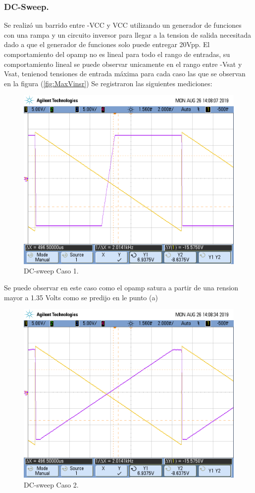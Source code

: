 \subsubsection{DC-Sweep.}
Se realizó un barrido entre -VCC y VCC utilizando un generador de funciones con una rampa y un circuito inversor para llegar a la tension de salida necesitada dado a que el generador de funciones solo puede entregar 20Vpp.
El comportamiento del opamp no es lineal para todo el rango de entradas, su comportamiento lineal se puede observar unicamente en el rango entre -Vsat y Vsat, tenienod tensiones de entrada máxima para cada caso las que se observan en la figura (\ref{fig:MaxVinsr})
Se registraron las siguientes mediciones:
\begin{figure}[H]	
	\centering
	\includegraphics[width=\textwidth]{Ejercicio1/Imagenes/dc_sweep_c1.png}
	\caption{DC-sweep Caso 1.}
	\label{fig:dcc1}
\end{figure} 
Se puede observar en este caso como el opamp satura a partir de una rension mayor a 1.35 Volts como se predijo en le punto (a)
\begin{figure}[H]	
	\centering
	\includegraphics[width=\textwidth]{Ejercicio1/Imagenes/dc_sweep_c2.png}
	\caption{DC-sweep Caso 2.}
	\label{fig:dcc2}
\end{figure} 
